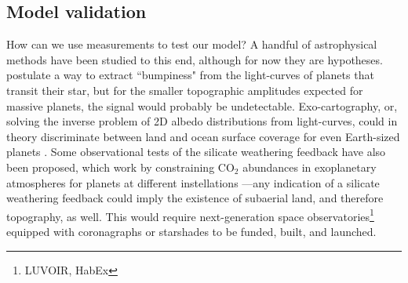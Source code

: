 \subsection{Model validation}

How can we use measurements to test our model? A handful of astrophysical methods have been studied to this end, although for now they are hypotheses. \citet{McTier2018} postulate a way to extract ``bumpiness" from the light-curves of planets that transit their star, but for the smaller topographic amplitudes expected for massive planets, the signal would probably be undetectable. Exo-cartography, or, solving the inverse problem of 2D albedo distributions from light-curves, could in theory discriminate between land and ocean surface coverage for even Earth-sized planets \citep{Cowan2018, Farr2018, Kawahara2020, Aizawa2020}. Some observational tests of the silicate weathering feedback have also been proposed, which work by constraining CO$_2$ abundances in exoplanetary atmospheres for planets at different instellations \citep{Bean2017,  Checlair2020}---any indication of a silicate weathering feedback could imply the existence of subaerial land, and therefore topography, as well. This would require next-generation space observatories\footnote{LUVOIR, HabEx} equipped with coronagraphs or starshades to be funded, built, and launched.

